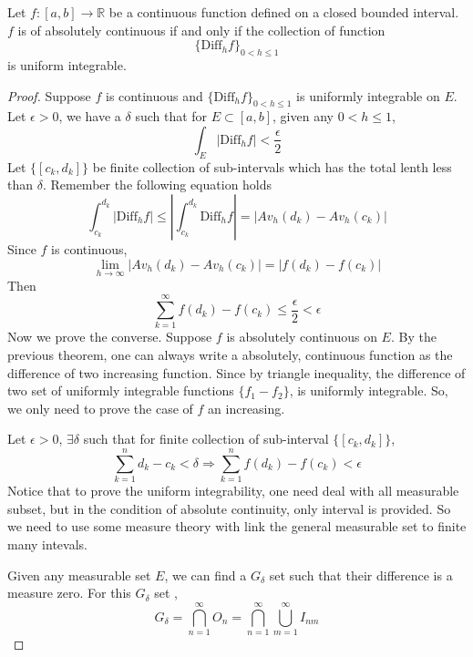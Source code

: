\documentclass[lang=en, 12pt]{elegantbook}
\newcommand{\RR}{\mathbb{R}}
\begin{document}
        \begin{theorem}\label{AbsoluteContinuousUniformIntegrable}
            Let $f:[a,b] \to \RR$ be a continuous function defined on a closed bounded interval. $f$ is of absolutely continuous if and only if 
        the collection of function $$\{\mbox{Diff}_hf\}_{0<h\leq 1}$$ is uniform integrable.
        \end{theorem}
        \begin{proof}
            Suppose $f$ is continuous and  
        $\{\mbox{Diff}_hf\}_{0<h\leq 1}$ is uniformly integrable
        on $E$. Let $\epsilon >0$, we have a $\delta$ such that 
        for $E \subset [a,b]$, given any $0<h\leq 1$,
            $$\int_E |\mbox{Diff}_h f| < \frac{\epsilon}{2}$$
            Let $\{[c_k, d_k]\}$ be finite collection of sub-intervals
        which has the total lenth less than $\delta$.
            Remember the following equation holds
            $$\int_{c_k}^{d_k} |\mbox{Diff}_h f| \leq |\int_{c_k}^{d_k} \mbox{Diff}_h f| = |Av_h (d_k)-Av_h (c_k)|$$
            Since $f$ is continuous, 
            $$\lim_{h \to \infty} |Av_h (d_k)-Av_h (c_k)| =|f(d_k) -f(c_k)|$$
            Then 
            $$\sum_{k=1}^{\infty} f(d_k)- f(c_k) \leq \frac{\epsilon }{2} <\epsilon$$
            Now we prove the converse.
            Suppose $f$ is absolutely continuous on $E$. 
            By the previous theorem, one can always write a absolutely,
            continuous function as the difference of two increasing function.
            Since by triangle inequality, the difference of two set of uniformly
            integrable functions $\{f_1 -f_2\}$, is uniformly integrable. So,
            we only need to prove the case of $f$ an increasing. \par
            Let $\epsilon> 0$, $\exists \delta$ such that for finite 
        collection of sub-interval $\{[c_k,d_k]\}$,
        $$\sum_{k=1}^{n} d_k-c_k < \delta \Rightarrow \sum_{k=1}^{n} f(d_k)-f(c_k) < \epsilon$$ 
        Notice that to prove the uniform integrability, one need 
        deal with all measurable subset, but in the condition of 
        absolute continuity, only interval is provided. So we need to 
        use some measure theory with link the general measurable set to 
        finite many intevals.\par 
            Given any measurable set $E$, we can find a $G_{\delta}$ set 
        such that their difference is a measure zero. For this $G_{\delta}$ set ,
        $$G_{\delta} = \bigcap_{n=1}^{\infty} O_n = \bigcap_{n=1}^{\infty} \bigcup_{m=1}^{\infty} I_{nm} $$

\end{proof}
\end{document}
